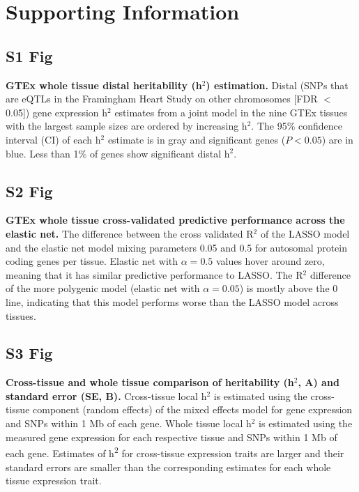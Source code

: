 \documentclass[10pt,letterpaper]{article}
\begin{document}
\nolinenumbers


%
%
% 



\section*{Supporting Information}


\subsection*{S1 Fig}
\label{S1_Fig}
{\bf GTEx whole tissue distal heritability (h$^2$) estimation.} Distal (SNPs that are eQTLs in the Framingham Heart Study on other chromosomes [FDR $<$ 0.05]) gene expression h$^2$ estimates from a joint model in the nine GTEx tissues with the largest sample sizes are ordered by increasing h$^2$. The 95\% confidence interval (CI) of each h$^2$ estimate is in gray and significant genes ($P<0.05$) are in blue. Less than 1\% of genes show significant distal h$^2$.

\subsection*{S2 Fig}
\label{S2_Fig}
{\bf GTEx whole tissue cross-validated predictive performance across the elastic net.} The difference between the cross validated R$^2$ of the LASSO model and the elastic net model mixing parameters 0.05 and 0.5 for autosomal protein coding genes per tissue. Elastic net with $\alpha=0.5$ values hover around zero, meaning that it has similar predictive performance to LASSO. The R$^2$ difference of the more polygenic model (elastic net with $\alpha=0.05$) is mostly above the 0 line, indicating that this model performs worse than the LASSO model across tissues.

\subsection*{S3 Fig}
\label{S3_Fig}
{\bf Cross-tissue and whole tissue comparison of heritability (h$^2$, A) and standard error (SE, B).} Cross-tissue local h$^2$ is estimated using the cross-tissue component (random effects) of the mixed effects model for gene expression and SNPs within 1 Mb of each gene. Whole tissue local h$^2$ is estimated using the measured gene expression for each respective tissue and SNPs within 1 Mb of each gene. Estimates of h\textsuperscript{2} for cross-tissue expression traits are larger and their standard errors are smaller than the corresponding estimates for each whole tissue expression trait.
\end{document}
